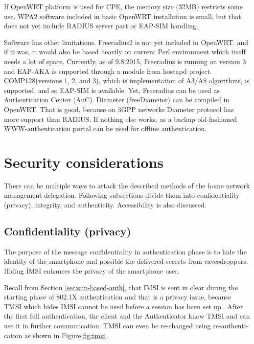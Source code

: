 \documentclass[12pt,a4paper,english]{tutthesis}
\begin{document}
\begin{otherlanguage}{english}
If OpenWRT platform  is used for CPE, the memory size (32MB) restricts some
use.
WPA2 software included in basic OpenWRT installation is small,
but that does not yet include RADIUS server part or EAP-SIM handling.


Software has other limitations. Freeradius2 is not yet included  in OpenWRT.
and if it was, it would also be based heavily on current Perl environment which
itself needs a lot of space.
Currently, as of 9.8.2015, Freeradius is running on version 3 and
EAP-AKA is supported through a module from hostapd project.
COMP128(versions 1, 2, and 3), which is implementation  of A3/A8
algorithms, is  supported\cite{freeradius2}, and so EAP-SIM is available.
Yet, Freeradius can be used as Authentication Center (AuC).
Diameter (freeDiameter) can be compiled in OpenWRT. That is good,
because on 3GPP networks Diameter protocol has more support than RADIUS.
If nothing else works, as a backup old-fashioned WWW-authentication
portal can be used for offline authentication.


\section{Security considerations}
\label{sec-6-4}



There can be multiple ways to attack the described methods of
the home network management delegation. Following subsections divide them into
confidentiality (privacy), integrity, and
authenticity. Accessibility is also discussed.
\subsection{Confidentiality (privacy)}
\label{sec-6-4-1}

The purpose of the message confidentiality in authentication phase is
to hide the identity of the smartphone and possible the delivered
secrets from eavesdroppers. Hiding IMSI enhances the privacy of the smartphone user. 


Recall from Section \ref{sec:sim-based-auth}, that IMSI is sent in clear 
during the starting phase of 802.1X authentication and that is a privacy 
issue, because TMSI which hides IMSI cannot be used before a session
has been set up.\cite[p.66]{rfc4186}.
After the first full authentication, the client and the Authenticator 
know TMSI and can use it in further communication. 
TMSI can even be re-changed using re-authentication as shown in Figure\ref{fig:tmsi}.


\end{otherlanguage}
\end{document}
